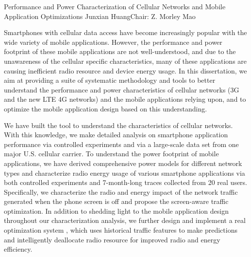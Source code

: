 \startabstractpage
{Performance and Power Characterization of Cellular Networks and Mobile Application Optimizations}
{Junxian Huang}{Chair: Z. Morley Mao}

Smartphones with cellular data access have become increasingly popular with the wide variety of mobile applications. However, the performance and power footprint of these mobile applications are not well-understood, and due to the unawareness of the cellular specific characteristics, many of these applications are causing inefficient radio resource and device energy usage. In this dissertation, we aim at providing a suite of systematic methodology and tools to better understand the performance and power characteristics of cellular networks (3G and the new LTE 4G networks) and the mobile applications relying upon, and to optimize the mobile application design based on this understanding.

We have built the \mobiperf tool to understand the characteristics of cellular networks. With this knowledge, we make detailed analysis on smartphone application performance via controlled experiments and via a large-scale data set from one major U.S. cellular carrier. To understand the power footprint of mobile applications, we have derived comprehensive power models for different network types and characterize radio energy usage of various smartphone applications via both controlled experiments and 7-month-long traces collected from 20 real users. Specifically, we characterize the radio and energy impact of the network traffic generated when the phone screen is off and propose the screen-aware traffic optimization. In addition to shedding light to the mobile application design throughout our characterization analysis, we further design and implement a real optimization system \NAMEFULL, which uses historical traffic features to make predictions and intelligently deallocate radio resource for improved radio and energy efficiency.


